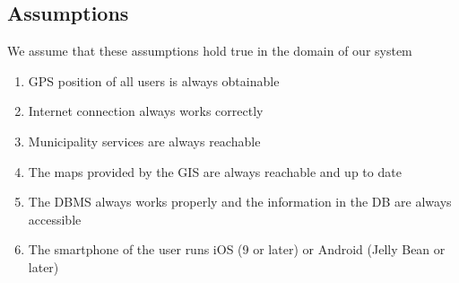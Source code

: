 \subsection{Assumptions}
	We assume that these assumptions hold true in the domain of our system 
	\begin{enumerate}[label=\textbf{	DA\arabic*}]
		\item \label{assumption:obtainableGPS} GPS position of all users is always obtainable
		\item \label{assumption:workingConnection} Internet connection always works correctly
		\item \label{assumption:municipalityReachable} Municipality services are always reachable
		\item \label{assumption:mapsReachable} The maps provided by the GIS are always reachable and up to date
		\item \label{assumption:workingDBMS} The DBMS always works properly and the information in the DB are always accessible
		\item \label{assumption:smartphoneOS} The smartphone of the user runs iOS (9 or later) or Android (Jelly Bean or later)
		\end{enumerate}
		
\clearpage